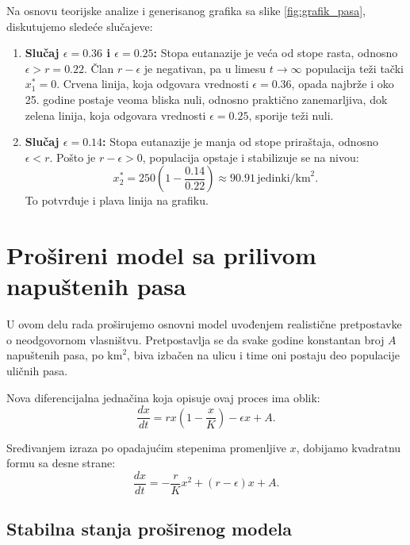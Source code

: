 \documentclass[12pt]{article}
\begin{document}
Na osnovu teorijske analize i generisanog grafika sa slike \ref{fig:grafik_pasa}, diskutujemo sledeće slučajeve:
\begin{enumerate}
    \item \textbf{Slučaj $\epsilon = 0.36$ i $\epsilon = 0.25$:} Stopa eutanazije je veća od stope rasta, odnosno $\epsilon > r = 0.22$. Član $r - \epsilon$ je negativan, pa u limesu $t \to \infty$ populacija teži tački $x_1^* = 0$. Crvena linija, koja odgovara vrednosti $\epsilon = 0.36$, opada najbrže i oko 25. godine postaje veoma bliska nuli, odnosno praktično zanemarljiva, dok zelena linija, koja odgovara vrednosti $\epsilon = 0.25$, sporije teži nuli.
    \item \textbf{Slučaj $\epsilon = 0.14$:} Stopa eutanazije je manja od stope priraštaja, odnosno $\epsilon < r$. Pošto je $r - \epsilon > 0$, populacija opstaje i stabilizuje se na nivou:
    \begin{equation}
    x_2^* = 250 \left(1 - \frac{0.14}{0.22}\right) \approx 90.91 \, \text{jedinki/km}^2.
    \end{equation}
    To potvrđuje i plava linija na grafiku.
\end{enumerate}

\section{Prošireni model sa prilivom napuštenih pasa}

U ovom delu rada proširujemo osnovni model uvođenjem realistične pretpostavke o neodgovornom vlasništvu. Pretpostavlja se da svake godine konstantan broj $A$ napuštenih pasa, po $\text{km}^2$, biva izbačen na ulicu i time oni postaju deo populacije uličnih pasa.

Nova diferencijalna jednačina koja opisuje ovaj proces ima oblik:
\begin{equation}
\frac{dx}{dt} = r x \left(1 - \frac{x}{K}\right) - \epsilon x + A.
\end{equation}

Sređivanjem izraza po opadajućim stepenima promenljive $x$, dobijamo kvadratnu formu sa desne strane:
\begin{equation}
\frac{dx}{dt} = -\frac{r}{K}x^2 + (r - \epsilon)x + A.
\end{equation}

\subsection{Stabilna stanja proširenog modela}
\end{document}
